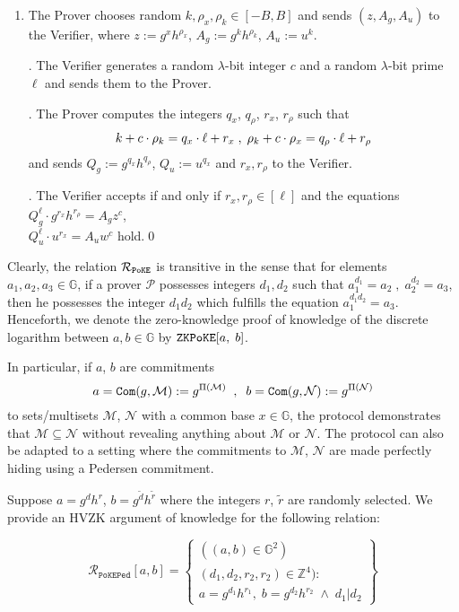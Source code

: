 \documentclass[11pt, lettersize, notitlepage, leqno, footskip=0.6cm]{article}
\newcommand{\ttt}{\texttt}
\newcommand{\bG}{\mathbb{G}}
\newcommand{\wti}{\widetilde}
\newcommand{\mc}{\mathcal}
\newcommand{\mb}{\mathbb}
\newcommand{\lam}{\lambda}
\newcommand{\sub}{\subseteq}
\newcommand{\mP}{\mc{P}}
\newcommand{\mcM}{\mc{M}}
\newcommand{\vs}{\vspace{-0.15cm}}
\newcommand{\noin}{\noindent}
\numberwithin{equation}{section}
\begin{document}
\begin{enumerate}[wide, labelwidth=!, labelindent=0pt]\vs \item The Prover chooses random $k, \rho_x, \rho_k\in [-B,B]$ and sends $(z, A_g, A_u)$ to the Verifier, where $z:= g^xh^{\rho_x}$, $A_g:= g^kh^{\rho_k}$, $A_u:= u^k$.

\noin 2. The Verifier generates a random $\lam$-bit integer $c$ and a random $\lam$-bit prime $\ell$ and sends them to the Prover.

\noin 3. The Prover computes the integers $q_x$, $q_{\rho}$, $r_x$, $r_{\rho}$ such that \vs $$k+c\cdot \rho_k = q_x\cdot \ell + r_x\;,\; \rho_k+c\cdot \rho_x = q_{\rho}\cdot \ell + r_{\rho} \vs $$ and sends $Q_g:= g^{q_x}h^{q_{\rho}}$, $Q_u:= u^{q_x}$ and $r_x,r_{\rho}$ to the Verifier.

\noin 4. The Verifier accepts if and only if $r_x,r_{\rho}\in [\ell]$ and the equations $Q_g^{\ell}\cdot g^{r_x}h^{r_{\rho}} = A_gz^c$,\\ $Q_u^{\ell}\cdot u^{r_x} = A_u w^{c}  $ hold.\qed \end{enumerate}

\noin Clearly, the relation $\mc{R}_{\tt{PoKE}}$ is transitive in the sense that for elements $a_1,a_2,a_3\in\mb{G}$, if a prover $\mP$ possesses integers $d_1,d_2$ such that $a_1^{d_1} = a_2\;,\;a_2^{d_2} = a_3$, then he possesses the integer $d_1d_2$ which fulfills the equation $a_1^{d_1d_2} = a_3$. Henceforth, we denote the zero-knowledge proof of knowledge of the discrete logarithm between $a,b\in\mb{G}$ by $\verb|ZKPoKE|[a,\;b]$.

In particular, if $a$, $b$ are commitments \vs $$ a = \ttt{Com}(g, \mc{M}) := g^{\Pi(\mcM)}\;\;,\;\;b = \ttt{Com}(g, \mc{N}) := g^{\Pi(\mc{N})}  \vs $$ to sets/multisets $\mcM$, $\mc{N}$ with  a common base $x\in\bG$, the protocol demonstrates that $\mcM\sub \mc{N}$ without revealing anything about $\mcM$ or $\mc{N}$. The protocol can also be adapted to a setting where the commitments to $\mc{M}$, $\mc{N}$ are made perfectly hiding using a Pedersen commitment.

Suppose $a = g^{d}h^{r}$, $b = g^{\wti{d}}h^{\wti{r}}$ where the integers $r$, $\wti{r}$ are randomly selected. We provide an HVZK argument of knowledge for  the following relation:\vs

\[
  \mc{R}_{\ttt{PoKEPed}}[a,b] = \left\{\begin{array}{l}
    ((a, b)\in\mb{G}^2)\\
    (d_1,d_2,r_2,r_2)\in\mb{Z}^4): \\
    a = g^{d_1}h^{r_1},\;b = g^{d_2}h^{r_2}\;\wedge\;d_1\big|d_2  \end{array}\right\}
\] 
\end{document}
